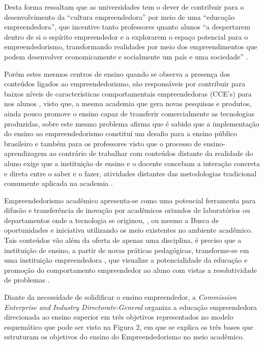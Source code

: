 Desta forma  ressaltam que as universidades tem o dever de contribuir para o desenvolvimento da “cultura empreendedora” por meio de uma “educação empreendedora”, que incentive tanto professores quanto alunos “a despertarem dentro de si o espírito empreendedor e a explorarem o espaço potencial para o empreendedorismo, transformando realidades por meio dos empreendimentos que podem desenvolver economicamente e socialmente um país e uma sociedade” \cite{tscha_empreendendo_2014}. 

Porém estes mesmos centros de ensino quando se observa a presença dos conteúdos ligados ao empreendedorismo, são responsáveis por contribuir para baixos níveis de características comportamentais empreendedoras (CCE’s) para nos alunos \cite{minello_caracteristicas_2017}, visto que, a mesma academia que gera novas pesquisas e produtos, ainda pouco promove o ensino capaz de transferir comercialmente as  tecnologias produzidas, sobre este mesmo problema  afirma que é sabido que a implementação do ensino ao empreendedorismo constituí um desafio para a ensino público brasileiro e também para os professores visto que o processo de ensino-aprendizagem ao contrário de trabalhar com conteúdos distante da realidade do aluno exige que a instituição de ensino e o docente concebam a interação concreta e direta entre o saber e o fazer, atividades distantes das metodologias tradicional comumente aplicada na academia \cite{saviani_historia_2019}. 

Empreendedorismo acadêmico apresenta-se como uma potencial ferramenta para difusão e transferência de inovação por acadêmicos oriundos de laboratórios ou departamentos onde a tecnologia se originou, \cite{guo_what_2019, abreu_nature_2013}, ou mesmo a Busca de oportunidades e iniciativa utilizando os meio existentes no ambiente acadêmico. Tais conteúdos vão além da oferta de apenas uma disciplina, é preciso que a instituição de ensino, a partir de novas práticas pedagógicas, transforme-se em uma instituição empreendedora \cite{campelli_empreendedorismo_2011}, que visualize a potencialidade da educação e promoção do comportamento empreendedor ao aluno com vistas a resolutividade de problemas \cite{degen_o_1989}.

Diante da necessidade de solidificar o ensino empreendedor, a \textit{Commission Enterprise and Industry Directorate-General} \cite{european_commission_best_2008} organiza a educação empreendedora direcionada ao ensino superior em três objetivos representados no modelo esquemático que pode ser visto na Figura 2, em que se explica os três bases que estruturam os objetivos do ensino do Empreendedorismo no meio acadêmico. 

